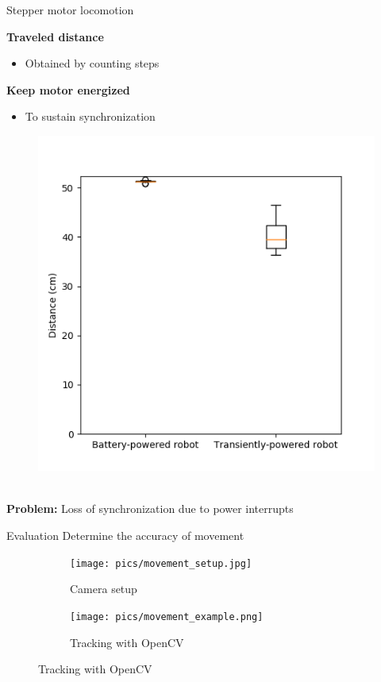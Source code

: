 \documentclass{beamer}
\begin{document}
\begin{frame}{Stepper motor locomotion}
	\begin{minipage}{0.49\textwidth}
		\textbf{Traveled distance}
		\begin{itemize}
			\item Obtained by counting steps
		\end{itemize}
		\vspace{1em}
		\textbf{Keep motor energized}
		\begin{itemize}
			\item To sustain synchronization
		\end{itemize}

	\end{minipage}
	\begin{minipage}{0.50\textwidth}\raggedleft
		\begin{figure}
			\includegraphics[width=\textwidth]{pics/stepper_motor_figure_magnitude_experiment.png}
		\end{figure}
	\end{minipage}\\
	\pause
	\vspace{1em}
	\textbf{Problem:} Loss of synchronization due to power interrupts
\end{frame}


\begin{frame}{Evaluation}
	Determine the accuracy of movement
	\vspace{1em}
	\begin{figure}
		\centering
		\begin{subfigure}[b]{0.45\textwidth}
			\texttt{[image: pics/movement\_setup.jpg]}
			\caption*{Camera setup}
		\end{subfigure}
		\quad
		\begin{subfigure}[b]{0.45\textwidth}
			\texttt{[image: pics/movement\_example.png]}
			\caption*{Tracking with OpenCV}
		\end{subfigure}
	\end{figure}
\end{frame}
\end{document}
